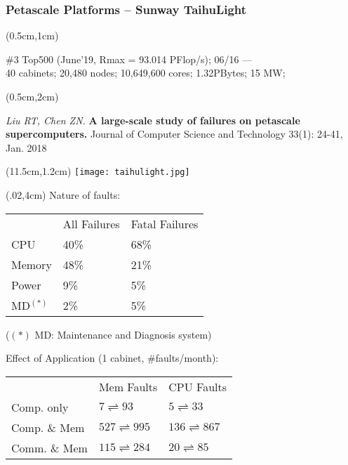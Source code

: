 \begin{frame}
  \frametitle{Petascale Platforms -- Sunway TaihuLight}

  \begin{textblock*}{10cm}(0.5cm,1cm)
    \begin{block}{}
      \footnotesize \#3 Top500 (June'19, Rmax = 93.014 PFlop/s);
     06/16 --- \\
     40 cabinets; 20,480 nodes; 10,649,600 cores; 1.32PBytes; 15 MW; 
    \end{block}
  \end{textblock*}
    
  \begin{textblock*}{10cm}(0.5cm,2cm)
    \begin{exampleblock}{}
     \footnotesize \emph{Liu RT, Chen ZN.} \textbf{A large-scale study of failures on
     petascale supercomputers.} Journal of Computer Science and
   Technology 33(1): 24-41, Jan. 2018
    \end{exampleblock}
  \end{textblock*}

  \begin{textblock*}{4cm}(11.5cm,1.2cm) %
    \texttt{[image: taihulight.jpg]}
  \end{textblock*}

  \begin{textblock*}{.5\linewidth}(.02\linewidth,4cm)
    \footnotesize Nature of faults:
    \begin{tabular}{lll}
                & All Failures & Fatal Failures\\
      CPU       & 40\%         & 68\% \\
      Memory    & 48\%         & 21\% \\
      Power     & 9\%          & 5\%\\
      MD$^{(*)}$ & 2\%          & 5\% \\
    \end{tabular}

    {\scriptsize ($(*)$ MD: Maintenance and Diagnosis system)}

    \medskip
    Effect of Application (1 cabinet, \#faults/month):
    \begin{tabular}{lll}
                     & Mem Faults                   & CPU Faults \\
        Comp. only   & $7 \rightleftharpoons 93$    & $5 \rightleftharpoons 33$ \\
        Comp. \& Mem & $527 \rightleftharpoons 995$ & $136 \rightleftharpoons 867$ \\
        Comm. \& Mem & $115 \rightleftharpoons 284$ & $20 \rightleftharpoons 85$
    \end{tabular}
  \end{textblock*}


\end{frame}
